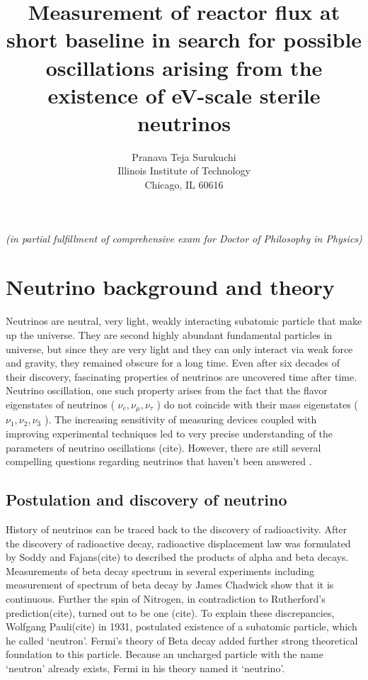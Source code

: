 \documentclass[11pt]{article}
\author{Pranava Teja Surukuchi \\ Illinois Institute of Technology\\ Chicago, IL 60616}
\title{Measurement of reactor flux at short baseline in search for possible oscillations arising from the existence of eV-scale sterile neutrinos}
\date{\displaydate{date}}
\begin{document}
\maketitle
\begin{center}
\textit{(in partial fulfillment of comprehensive exam for Doctor of Philosophy in Physics)}
\end{center}
\newpage

\tableofcontents

\newpage


\section{Neutrino background and theory}
Neutrinos are neutral, very light, weakly interacting subatomic particle that make up the universe. They are second highly abundant fundamental particles in universe, but since they are very light and they can only interact via weak force and gravity, they remained obscure for a long time. Even after six decades of their discovery, fascinating properties of neutrinos are uncovered time after time. Neutrino oscillation, one such property arises from the fact that the flavor eigenstates of neutrinos ( $ \nu_{e}, \nu_{\mu}, \nu_{\tau} $ ) do not coincide with their mass eigenstates ( $ \nu_{1}, \nu_{2}, \nu_{3} $ ). The increasing sensitivity of measuring devices coupled with improving experimental techniques led to very precise understanding of the parameters of neutrino oscillations (cite). However, there are still several compelling questions regarding neutrinos that haven't been answered . 

\subsection{Postulation and discovery of neutrino}
\label{discovery}
History of neutrinos can be traced back to the discovery of radioactivity. After the discovery of radioactive decay, radioactive displacement law was formulated by Soddy and Fajans(cite) to described the products of alpha and beta decays. Measurements of beta decay spectrum in several experiments including measurement of spectrum of beta decay by James Chadwick show that it is continuous. Further the spin of Nitrogen, in contradiction to Rutherford's prediction(cite), turned out to be one (cite). To explain these discrepancies, Wolfgang Pauli(cite) in 1931, postulated existence of a subatomic particle, which he called `neutron'. Fermi's theory of Beta decay added further strong theoretical foundation to this particle. Because an uncharged particle with the name `neutron' already exists, Fermi in his theory named it `neutrino'.
\end{document}
